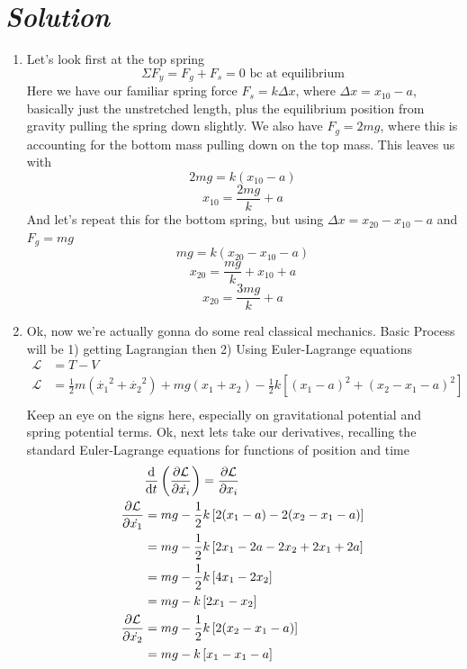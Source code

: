 \documentclass{article}
\newcommand{\Lagr}{\mathcal{L}} %
\begin{document}
\section*{\textit{Solution}} 
\begin{enumerate}[label=\alph*)]
	\item %
	Let's look first at the top spring
	\[ \Sigma F_y = F_g + F_s = 0 \text{ bc at equilibrium} \]
	Here we have our familiar spring force $F_s = k\Delta x$, where $\Delta x = x_{10} - a$, basically just the unstretched length, plus the equilibrium position from gravity pulling the spring down slightly. We also have $F_g = 2mg$, where this is accounting for the bottom mass pulling down on the top mass. This leaves us with
	\[ 2mg = k(x_{10} - a) \]
	\[ \boxed{x_{10} = \frac{2mg}{k} + a }\]
	And let's repeat this for the bottom spring, but using $\Delta x = x_{20} - x_{10} - a$ and $F_g = mg$
	\[ mg = k(x_{20} - x_{10} - a) \]
	\[ x_{20} = \frac{mg}{k} + x_{10} + a \]
	\[ \boxed{x_{20} = \frac{3mg}{k} + a }\]
	\item %
	Ok, now we're actually gonna do some real classical mechanics. Basic Process will be 1) getting Lagrangian then 2) Using Euler-Lagrange equations
	\begin{align}
		\Lagr &= T - V \\ 
		\Lagr &= \frac{1}{2}m\left(\dot{x_1}^2 + \dot{x_2}^2\right) + mg\left(x_1 + x_2\right) - \frac{1}{2}k\left[(x_1 - a)^2 + (x_2 - x_1 - a)^2\right] \\ 
	\end{align}
	Keep an eye on the signs here, especially on gravitational potential and spring potential terms. Ok, next lets take our derivatives, recalling the standard Euler-Lagrange equations for functions of position and time
	\begin{align}
		&\dv{}{t} \left( \pdv{ \Lagr}{\dot{x_i}} \right) = \pdv{\Lagr}{x_i} \\
		\pdv{ \Lagr}{\dot{x_1}} &= mg - \frac{1}{2}k\left[2(x_1 - a) - 2(x_2 - x_1 -a) \right] \\
		&= mg - \frac{1}{2}k\left[2x_1 - 2a - 2x_2 + 2x_1 + 2a \right] \\
		&= mg - \frac{1}{2}k\left[4x_1 - 2x_2\right] \\
		&= mg - k\left[2x_1 - x_2\right] \\
		\pdv{ \Lagr}{\dot{x_2}} &= mg - \frac{1}{2}k\left[ 2(x_2 - x_1 -a) \right] \\
		&= mg - k\left[x_1 - x_1 - a\right]
	\end{align}

\end{enumerate}
\end{document}
